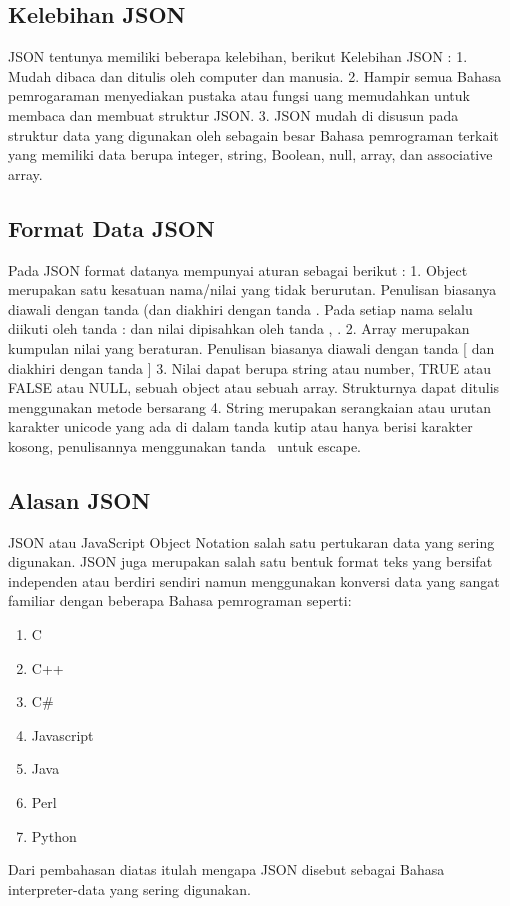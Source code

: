 \subsection{Kelebihan JSON}
JSON tentunya memiliki beberapa kelebihan, berikut Kelebihan JSON :
1.	Mudah dibaca dan ditulis oleh computer dan manusia.
2.	Hampir semua Bahasa pemrogaraman menyediakan pustaka atau fungsi uang memudahkan untuk membaca dan membuat struktur JSON.
3.	JSON mudah di disusun pada struktur data yang digunakan oleh sebagain besar Bahasa pemrograman terkait yang memiliki data berupa integer, string, Boolean, null, array, dan associative array.

\subsection{Format Data JSON}
Pada JSON format datanya mempunyai aturan sebagai berikut :
1. Object merupakan satu kesatuan nama/nilai yang tidak berurutan. Penulisan biasanya diawali dengan tanda { (dan diakhiri dengan tanda } .
Pada setiap nama selalu diikuti oleh tanda : dan nilai dipisahkan oleh tanda , .
2.  Array merupakan kumpulan nilai yang beraturan. Penulisan biasanya diawali dengan tanda [ dan diakhiri dengan tanda ]
3. Nilai dapat berupa string atau number, TRUE atau FALSE atau NULL, sebuah object atau sebuah array. Strukturnya dapat ditulis menggunakan metode bersarang
4. String merupakan serangkaian atau urutan karakter unicode yang ada di dalam tanda kutip atau hanya berisi karakter kosong, penulisannya menggunakan tanda \  untuk escape.

\subsection{Alasan JSON}
JSON atau JavaScript Object Notation salah satu pertukaran data yang sering digunakan. JSON juga merupakan salah satu bentuk format teks yang bersifat independen atau berdiri sendiri namun menggunakan konversi data yang sangat familiar dengan beberapa Bahasa pemrograman seperti:

\begin{enumerate}
\item C
\item C++
\item C\#
\item Javascript
\item Java
\item Perl
\item Python

\end{enumerate}
Dari pembahasan diatas itulah mengapa JSON disebut sebagai Bahasa interpreter-data yang sering digunakan.
